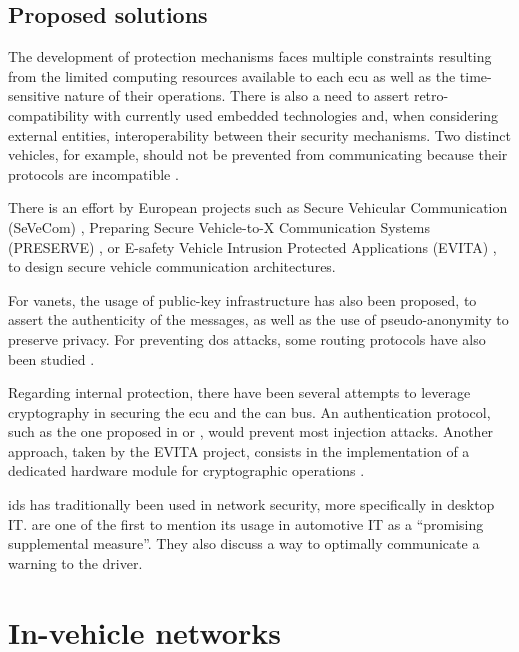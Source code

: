 \subsection{Proposed solutions}

The development of protection mechanisms faces multiple constraints resulting from the limited computing resources available to each \gls{ecu} as well as the time-sensitive nature of their operations. There is also a need to assert retro-compatibility with currently used embedded technologies and, when considering external entities, interoperability between their security mechanisms. Two distinct vehicles, for example, should not be prevented from communicating because their protocols are incompatible \citep{Studnia2013}.\par

There is an effort by European projects such as Secure Vehicular Communication (SeVeCom) \citep{Kargl2008}, Preparing Secure Vehicle-to-X Communication Systems (PRESERVE) \citep{PRESERVE}, or E-safety Vehicle Intrusion Protected Applications (EVITA) \citep{EVITA}, to design secure vehicle communication architectures.\par

For \glspl{vanet}, the usage of public-key infrastructure has also been proposed, to assert the authenticity of the messages, as well as the use of pseudo-anonymity to preserve privacy. For preventing \gls{dos} attacks, some routing protocols have also been studied \citep{Hasrouny2017}.\par

Regarding internal protection, there have been several attempts to leverage cryptography in securing the \gls{ecu} and the \gls{can} bus. An authentication protocol, such as the one proposed in \cite{Herrewege2011} or \cite{Groza2018}, would prevent most injection attacks. Another approach, taken by the EVITA project, consists in the implementation of a dedicated hardware module for cryptographic operations \citep{Wolf2011}.\par

\gls{ids} has traditionally been used in network security, more specifically in desktop IT. \cite{hoppe2009applying} are one of the first to mention its usage in automotive IT as a “promising supplemental measure”. They also discuss a way to optimally communicate a warning to the driver.

\section{In-vehicle networks}

